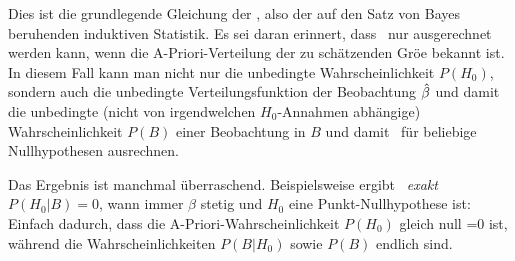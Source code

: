 %
Dies ist die grundlegende Gleichung der ,
also der auf den Satz von Bayes beruhenden induktiven Statistik. Es
sei daran erinnert, dass~ nur ausgerechnet werden kann,
wenn die A-Priori-Verteilung der zu sch\"atzenden Gr\"o\3e bekannt
ist. In
diesem Fall kann man nicht nur die unbedingte Wahrscheinlichkeit
$P(H_0)$, sondern auch die unbedingte Verteilungsfunktion der
Beobachtung $\hat{\beta}$ und damit die unbedingte (nicht von irgendwelchen
$H_0$-Annahmen abh\"angige) Wahrscheinlichkeit $P(B)$ einer
Beobachtung in $B$ 
und damit~ f\"ur beliebige Nullhypothesen
ausrechnen. 

Das Ergebnis ist manchmal \"uberraschend. Beispielsweise
ergibt~ \emph{exakt} $P(H_0|B)=0$, wann immer $\beta$
stetig und $H_0$ eine
Punkt-Nullhypothese ist: Einfach dadurch, dass die
A-Priori-Wahrscheinlichkeit $P(H_0)$ gleich null =0 ist, w\"ahrend die
Wahr\-schein\-lich\-keiten $P(B|H_0)$
sowie $P(B)$ endlich sind. 

